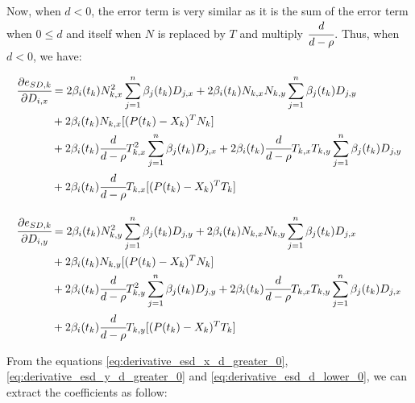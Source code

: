 \documentclass{article}
\begin{document}
Now, when $d < 0$, the error term is very similar as it is the sum of the error term when $0 \leq d$ and itself when $N$ is replaced by $T$ and multiply $\cfrac{d}{d-\rho}$. Thus, when $d < 0$, we have:

\begin{equation}
\label{eq:derivative_esd_d_lower_0}
    \begin{aligned}
        \cfrac{\partial e_{SD,k}}{\partial D_{i,x}} 
        & = 2\beta_i(t_k)N_{k,x}^2 \sum \limits_{j=1}^{n} \beta_j(t_k)D_{j,x} 
        + 2\beta_i(t_k)N_{k,x}N_{k,y} \sum \limits_{j=1}^{n} \beta_j(t_k)D_{j,y} \\
        & + 2\beta_i(t_k)N_{k,x} [(P(t_k)-X_k)^T N_k] \\
        & + 2\beta_i(t_k) \cfrac{d}{d-\rho} T_{k,x}^2 \sum \limits_{j=1}^{n} \beta_j(t_k)D_{j,x} 
        + 2\beta_i(t_k) \cfrac{d}{d-\rho} T_{k,x}T_{k,y} \sum \limits_{j=1}^{n} \beta_j(t_k)D_{j,y} \\
        & + 2\beta_i(t_k) \cfrac{d}{d-\rho} T_{k,x} [(P(t_k)-X_k)^T T_k] 
        \\[10pt]
        \cfrac{\partial e_{SD,k}}{\partial D_{i,y}} 
        & = 2\beta_i(t_k)N_{k,y}^2 \sum \limits_{j=1}^{n} \beta_j(t_k)D_{j,y} 
        + 2\beta_i(t_k)N_{k,x}N_{k,y} \sum \limits_{j=1}^{n} \beta_j(t_k)D_{j,x} \\
        & + 2\beta_i(t_k)N_{k,y} [(P(t_k)-X_k)^T N_k] \\
        & + 2\beta_i(t_k) \cfrac{d}{d-\rho} T_{k,y}^2 \sum \limits_{j=1}^{n} \beta_j(t_k)D_{j,y} 
        + 2\beta_i(t_k) \cfrac{d}{d-\rho} T_{k,x}T_{k,y} \sum \limits_{j=1}^{n} \beta_j(t_k)D_{j,x} \\
        & + 2\beta_i(t_k) \cfrac{d}{d-\rho} T_{k,y} [(P(t_k)-X_k)^T T_k]
    \end{aligned}
\end{equation}

From the equations \ref{eq:derivative_esd_x_d_greater_0}, \ref{eq:derivative_esd_y_d_greater_0} and \ref{eq:derivative_esd_d_lower_0}, we can extract the coefficients as follow:
\end{document}
